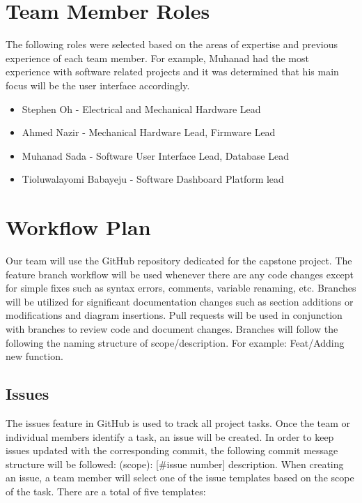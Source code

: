 \documentclass[12pt]{article}
\begin{document}
\section{Team Member Roles}
The following roles were selected based on the areas of expertise and previous experience of each team member. 
For example, Muhanad had the most experience with software related projects and it was determined that his main focus will be the user interface accordingly.
\begin{itemize}
	\item Stephen Oh - Electrical and Mechanical Hardware Lead
	\item Ahmed Nazir - Mechanical Hardware Lead, Firmware Lead
	\item Muhanad Sada - Software User Interface Lead, Database Lead
	\item Tioluwalayomi Babayeju - Software Dashboard Platform lead
\end{itemize}


\section{Workflow Plan}
Our team will use the GitHub repository dedicated for the capstone project. The feature
branch workflow will be used whenever there are any code changes except for simple fixes such as syntax errors, comments, variable renaming, etc. 
Branches will be utilized for significant documentation changes such as section additions or modifications and diagram insertions. 
Pull requests will be used in conjunction with branches to review code and document changes.
Branches will follow the following the naming structure of scope/description. For example: Feat/Adding new function.

\newpage

\subsection{Issues}
The issues feature in GitHub is used to track all project tasks. Once the team or individual members identify a task, an issue will be created. In order to keep issues updated with the corresponding commit, the following commit message structure will be followed: (scope): [\#issue number] description. When creating an issue, a team member will select one of the issue templates based on the scope of the task. There are a total of five templates: 
\end{document}
